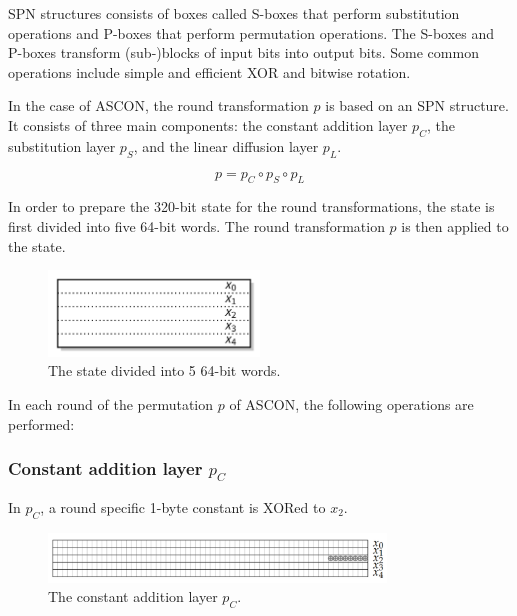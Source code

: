\documentclass{article}
\begin{document}
SPN structures consists of boxes called S-boxes that perform substitution operations and P-boxes that perform permutation operations. The S-boxes and P-boxes transform (sub-)blocks of input bits into output bits. Some common operations include simple and efficient XOR and bitwise rotation. \cite{mustafeez}

In the case of ASCON, the round transformation $p$ is based on an SPN structure. It consists of three main components: the constant addition  layer $p_C$, the substitution layer $p_S$, and the linear diffusion layer $p_L$. \cite{DBLP:journals/joc/DobraunigEMS21, ascon_specification} \par

\[p=p_C \circ p_S \circ p_L\]

In order to prepare the 320-bit state for the round transformations, the state is first divided into five 64-bit words. The round transformation $p$ is then applied to the state. \cite{DBLP:journals/joc/DobraunigEMS21} \par 

\begin{figure}[htbp]
  \centering
  \includegraphics[width=0.5\textwidth]{images/state.png}
  \caption{The state divided into 5 64-bit words.}
  \label{fig:state}
\end{figure}

In each round of the permutation $p$ of ASCON, the following operations are performed:

\subsubsection{Constant addition layer $p_C$}
In $p_C$, a round specific 1-byte constant is XORed to $x_2$. \cite{ascon_specification, analysis_of_ascon}
  
\begin{figure}[htbp]
  \centering
  \includegraphics[width=0.8\textwidth]{images/constant.png}
  \caption{The constant addition layer $p_C$.}
  \label{fig:constant}
\end{figure}
\end{document}
